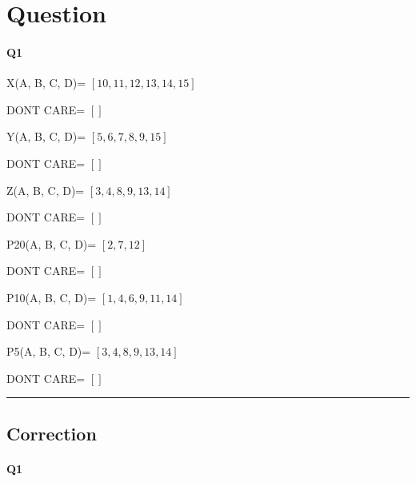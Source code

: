 
\section{Question}


\paragraph{Q1}


X(A, B, C, D)= $[10, 11, 12, 13, 14, 15]$

DONT CARE= $[]$

Y(A, B, C, D)= $[5, 6, 7, 8, 9, 15]$

DONT CARE= $[]$

Z(A, B, C, D)= $[3, 4, 8, 9, 13, 14]$

DONT CARE= $[]$

P20(A, B, C, D)= $[2, 7, 12]$

DONT CARE= $[]$

P10(A, B, C, D)= $[1, 4, 6, 9, 11, 14]$

DONT CARE= $[]$

P5(A, B, C, D)= $[3, 4, 8, 9, 13, 14]$

DONT CARE= $[]$



\hrule width 1\linewidth
\pagebreak

\subsection{Correction}


\paragraph{Q1}


